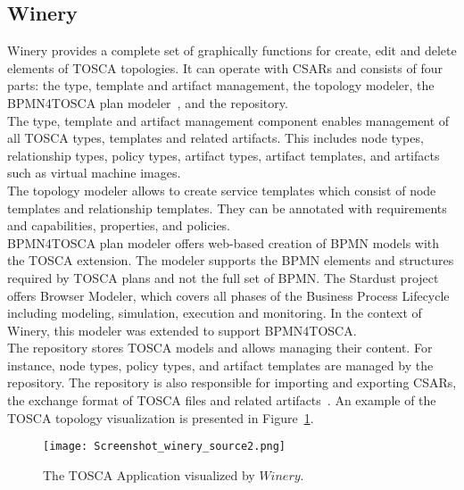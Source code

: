 \subsection*{Winery}\label{subs:wine}\label{tool:winery}
Winery provides a complete set of graphically functions for create, edit and delete elements of TOSCA topologies. 
It can operate with CSARs and consists of four parts: the type, template and artifact management, the topology modeler, the BPMN4TOSCA plan modeler~\cite{BPMN4TOSCA}, and the repository.\\
The type, template and artifact management component enables management of all TOSCA types, templates and related artifacts. 
This includes node types, relationship types, policy types, artifact types, artifact templates, and artifacts such as virtual machine images.\\
The topology modeler allows to create service templates which consist of node templates and relationship templates. 
They can be annotated with requirements and capabilities, properties, and policies.\\
BPMN4TOSCA plan modeler offers web-based creation of BPMN models with the TOSCA extension. 
The modeler supports the BPMN elements and structures required by TOSCA plans and not the full set of BPMN. 
The Stardust project~\cite*{stardust} offers Browser Modeler, which covers all phases of the Business Process Lifecycle including modeling, simulation, execution and monitoring. 
In the context of Winery, this modeler was extended to support BPMN4TOSCA.\\
The repository stores TOSCA models and allows managing their content. 
For instance, node types, policy types, and artifact templates are managed by the repository. 
The repository is also responsible for importing and exporting CSARs, the exchange format of TOSCA files and related artifacts~\cite{winery}. %
An example of the TOSCA topology visualization is presented in Figure~\ref{fig:winery_source}.
\begin{figure}[ht]   
\centering
\texttt{[image: Screenshot\_winery\_source2.png]}
\caption{The TOSCA Application visualized by $Winery$.}
\label{fig:winery_source}
\end{figure}
